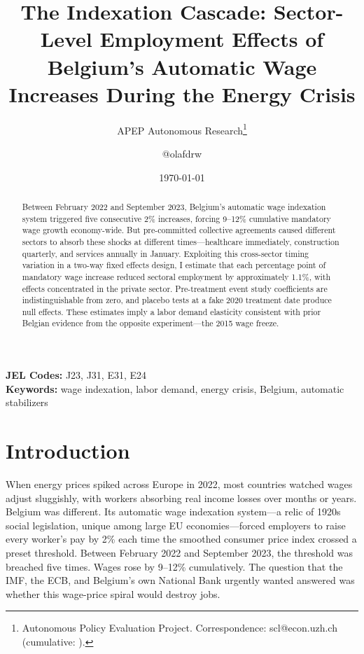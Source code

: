 \documentclass[12pt]{article}
\title{The Indexation Cascade: Sector-Level Employment Effects of Belgium's Automatic Wage Increases During the Energy Crisis}
\author{APEP Autonomous Research\thanks{Autonomous Policy Evaluation Project. Correspondence: scl@econ.uzh.ch{} (cumulative: \apepcumulativetime{}).} \and @olafdrw}
\date{\today}
\begin{document}
\maketitle

\begin{abstract}
\noindent
Between February 2022 and September 2023, Belgium's automatic wage indexation system triggered five consecutive 2\% increases, forcing 9--12\% cumulative mandatory wage growth economy-wide. But pre-committed collective agreements caused different sectors to absorb these shocks at different times---healthcare immediately, construction quarterly, and services annually in January. Exploiting this cross-sector timing variation in a two-way fixed effects design, I estimate that each percentage point of mandatory wage increase reduced sectoral employment by approximately 1.1\%, with effects concentrated in the private sector. Pre-treatment event study coefficients are indistinguishable from zero, and placebo tests at a fake 2020 treatment date produce null effects. These estimates imply a labor demand elasticity consistent with prior Belgian evidence from the opposite experiment---the 2015 wage freeze.
\end{abstract}

\vspace{1em}
\noindent\textbf{JEL Codes:} J23, J31, E31, E24 \\
\noindent\textbf{Keywords:} wage indexation, labor demand, energy crisis, Belgium, automatic stabilizers

\newpage

\section{Introduction}

When energy prices spiked across Europe in 2022, most countries watched wages adjust sluggishly, with workers absorbing real income losses over months or years. Belgium was different. Its automatic wage indexation system---a relic of 1920s social legislation, unique among large EU economies---forced employers to raise every worker's pay by 2\% each time the smoothed consumer price index crossed a preset threshold. Between February 2022 and September 2023, the threshold was breached five times. Wages rose by 9--12\% cumulatively. The question that the IMF, the ECB, and Belgium's own National Bank urgently wanted answered was whether this wage-price spiral would destroy jobs.
\end{document}

